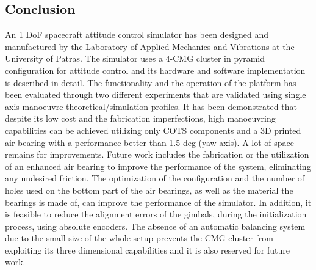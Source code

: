 \documentclass[aerospace,article,submit,moreauthors,dvi2pdf]{Definitions/mdpi}
\begin{document}
\begin{paracol}{2}
\section{Conclusion}
An 1 DoF spacecraft attitude control simulator has been designed and manufactured by the Laboratory of Applied Mechanics and Vibrations at the University of Patras. The simulator uses a 4-CMG cluster in pyramid configuration for attitude control and its hardware and software implementation is described in detail. The functionality and the operation of the platform has been evaluated through two different experiments that are validated using single axis manoeuvre theoretical/simulation profiles. It has been demonstrated that despite its low cost and the fabrication imperfections, high manoeuvring capabilities can be achieved utilizing only COTS components and a 3D printed air bearing with a performance better than 1.5 deg (yaw axis). A lot of space remains for improvements. Future work includes the fabrication or the utilization of an enhanced air bearing to improve the  performance of the system, eliminating any undesired friction. The optimization of the configuration and the number of holes used on the bottom part of the air bearings, as well as the material the bearings is made of, can improve the performance of the simulator. In addition, it is feasible to reduce the alignment errors of the gimbals, during the initialization process, using absolute encoders. The absence of an automatic balancing system due to the small size of the whole setup prevents the CMG cluster from exploiting its three dimensional capabilities and it is also reserved for future work. 






\vspace{6pt} 






\end{paracol}
\end{document}
